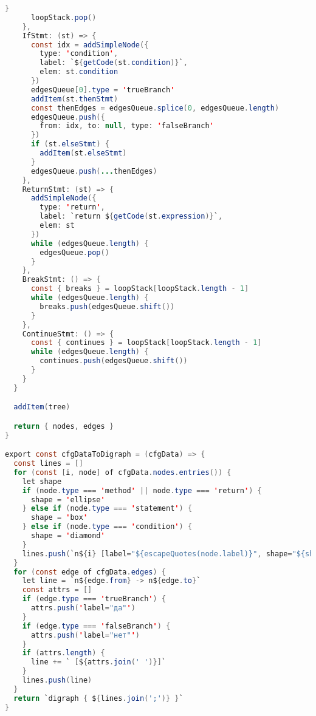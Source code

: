 \begin{lstlisting}[language=Java,
caption={cfg.js}]
      }
      loopStack.pop()
    },
    IfStmt: (st) => {
      const idx = addSimpleNode({
        type: 'condition',
        label: `${getCode(st.condition)}`,
        elem: st.condition
      })
      edgesQueue[0].type = 'trueBranch'
      addItem(st.thenStmt)
      const thenEdges = edgesQueue.splice(0, edgesQueue.length)
      edgesQueue.push({
        from: idx, to: null, type: 'falseBranch'
      })
      if (st.elseStmt) {
        addItem(st.elseStmt)
      }
      edgesQueue.push(...thenEdges)
    },
    ReturnStmt: (st) => {
      addSimpleNode({
        type: 'return',
        label: `return ${getCode(st.expression)}`,
        elem: st
      })
      while (edgesQueue.length) {
        edgesQueue.pop()
      }
    },
    BreakStmt: () => {
      const { breaks } = loopStack[loopStack.length - 1]
      while (edgesQueue.length) {
        breaks.push(edgesQueue.shift())
      }
    },
    ContinueStmt: () => {
      const { continues } = loopStack[loopStack.length - 1]
      while (edgesQueue.length) {
        continues.push(edgesQueue.shift())
      }
    }
  }

  addItem(tree)

  return { nodes, edges }
}

export const cfgDataToDigraph = (cfgData) => {
  const lines = []
  for (const [i, node] of cfgData.nodes.entries()) {
    let shape
    if (node.type === 'method' || node.type === 'return') {
      shape = 'ellipse'
    } else if (node.type === 'statement') {
      shape = 'box'
    } else if (node.type === 'condition') {
      shape = 'diamond'
    }
    lines.push(`n${i} [label="${escapeQuotes(node.label)}", shape="${shape}"]`)
  }
  for (const edge of cfgData.edges) {
    let line = `n${edge.from} -> n${edge.to}`
    const attrs = []
    if (edge.type === 'trueBranch') {
      attrs.push('label="да"')
    }
    if (edge.type === 'falseBranch') {
      attrs.push('label="нет"')
    }
    if (attrs.length) {
      line += ` [${attrs.join(' ')}]`
    }
    lines.push(line)
  }
  return `digraph { ${lines.join(';')} }`
}
\end{lstlisting}

